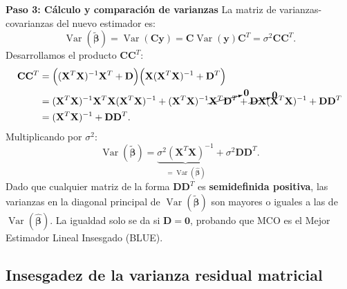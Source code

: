 \documentclass[11pt,a4paper]{article}
\begin{document}
\begin{demobox}
\textbf{Paso 3: Cálculo y comparación de varianzas}  
La matriz de varianzas-covarianzas del nuevo estimador es:
\begin{equation}
\operatorname{Var}(\tilde{\boldsymbol{\beta}}) = \operatorname{Var}(\mathbf{C}\mathbf{y}) = \mathbf{C}\operatorname{Var}(\mathbf{y})\mathbf{C}^T = \sigma^2 \mathbf{C}\mathbf{C}^T.
\end{equation}
Desarrollamos el producto $\mathbf{C}\mathbf{C}^T$:
\begin{align}
\mathbf{C}\mathbf{C}^T &= \Big( (\mathbf{X}^T \mathbf{X})^{-1} \mathbf{X}^T + \mathbf{D} \Big) \Big( \mathbf{X}(\mathbf{X}^T \mathbf{X})^{-1} + \mathbf{D}^T \Big) \\
&= (\mathbf{X}^T \mathbf{X})^{-1} \mathbf{X}^T \mathbf{X} (\mathbf{X}^T \mathbf{X})^{-1} + (\mathbf{X}^T \mathbf{X})^{-1} \cancelto{\mathbf{0}}{\mathbf{X}^T \mathbf{D}^T} + \cancelto{\mathbf{0}}{\mathbf{D}\mathbf{X}}(\mathbf{X}^T \mathbf{X})^{-1} + \mathbf{D}\mathbf{D}^T \\
&= (\mathbf{X}^T \mathbf{X})^{-1} + \mathbf{D}\mathbf{D}^T.
\end{align}
Multiplicando por $\sigma^2$:
\begin{equation}
\operatorname{Var}(\tilde{\boldsymbol{\beta}}) = \underbrace{\sigma^2 (\mathbf{X}^T \mathbf{X})^{-1}}_{= \operatorname{Var}(\hat{\boldsymbol{\beta}})} + \sigma^2 \mathbf{D}\mathbf{D}^T.
\end{equation}
Dado que cualquier matriz de la forma $\mathbf{D}\mathbf{D}^T$ es \textbf{semidefinida positiva}, las varianzas en la diagonal principal de $\operatorname{Var}(\tilde{\boldsymbol{\beta}})$ son mayores o iguales a las de $\operatorname{Var}(\hat{\boldsymbol{\beta}})$. La igualdad solo se da si $\mathbf{D} = \mathbf{0}$, probando que MCO es el Mejor Estimador Lineal Insesgado (BLUE).
\end{demobox}

\subsection{Insesgadez de la varianza residual matricial}
\end{document}
